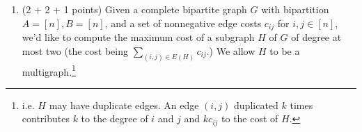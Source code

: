 \documentclass[12pt]{article}
\begin{document}
\begin{enumerate}
We are interested in deciding if there is a nonnegative matrix $A \in \R^{m \times n}$ with row sums $r$ and column sums $c$ with nonzero entries only in $T$, i.e. satisfying $A_{ij} = 0$ whenever $(i,j) \not \in T$.
\begin{enumerate}
\item Find a flow network that has value $R$ if and only if there exists such a matrix $A$. You do not need to justify the correctness of your network. \textbf{Hint:}\footnote{You may want to look at the flow network from Exercise 4-1 of the notes on flows, or the network used to reduce maximum bipartite matching to flows.}
\item Show that there exists such a matrix $A$ if and only if
$$\sum_{i \not \in I} r_i + \sum_{j \not \in J} c_j \geq R$$
for every pair of subsets $I \subset [m], J \subset [n]$ such that $I \times J$ contains no elements of $T$.
\item If $r$ and $c$ are integral and there exists such a matrix $A$, must there also exist such an \emph{integral} matrix $A$? Justify your answer with one or two sentences.\footnote{Part c is not intended to be related to part b.}
\end{enumerate}
\newpage
Blank page 
\newpage 

\item (2 + 2 + 1 points) Given a complete bipartite graph $G$ with bipartition $A = [n], B = [n]$, and a set of nonnegative edge costs $c_{ij}$ for $i,j \in [n]$, we'd like to compute the maximum cost of a subgraph $H$ of $G$ of degree at most two (the cost being $\sum_{(i,j) \in E(H)} c_{ij}$.) We allow $H$ to be a multigraph.\footnote{i.e. $H$ may have duplicate edges. An edge $(i,j)$ duplicated $k$ times contributes $k$ to the degree of $i$ and $j$ and $k c_{ij}$ to the cost of $H$.}


\end{enumerate}
\end{document}
